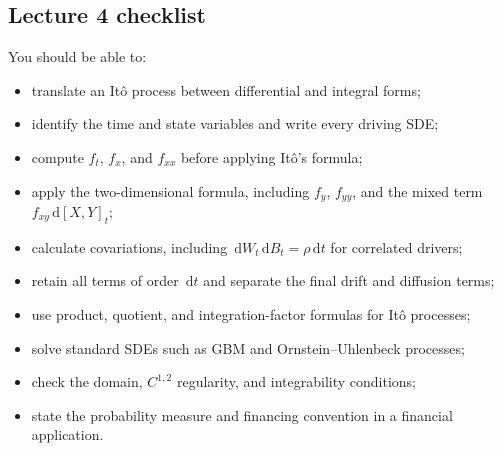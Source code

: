 \documentclass[11pt]{article}
\newcommand{\dd}{\,\mathrm{d}}
\newcommand{\1}{\mathbf{1}}
\theoremstyle{plain}
\theoremstyle{definition}
\theoremstyle{remark}
\begin{document}
\subsection*{Lecture 4 checklist}

You should be able to:
\begin{itemize}[leftmargin=1.5em,itemsep=0.15em]
  \item translate an It\^o process between differential and integral forms;
  \item identify the time and state variables and write every driving SDE;
  \item compute $f_t$, $f_x$, and $f_{xx}$ before applying It\^o's formula;
  \item apply the two-dimensional formula, including $f_y$, $f_{yy}$,
        and the mixed term $f_{xy}\dd[X,Y]_t$;
  \item calculate covariations, including
        $\dd W_t\dd B_t=\rho\dd t$ for correlated drivers;
  \item retain all terms of order $\dd t$ and separate the final drift and
        diffusion terms;
  \item use product, quotient, and integration-factor formulas for It\^o
        processes;
  \item solve standard SDEs such as GBM and Ornstein--Uhlenbeck processes;
  \item check the domain, $C^{1,2}$ regularity, and integrability conditions;
  \item state the probability measure and financing convention in a financial
        application.
\end{itemize}




\end{document}
